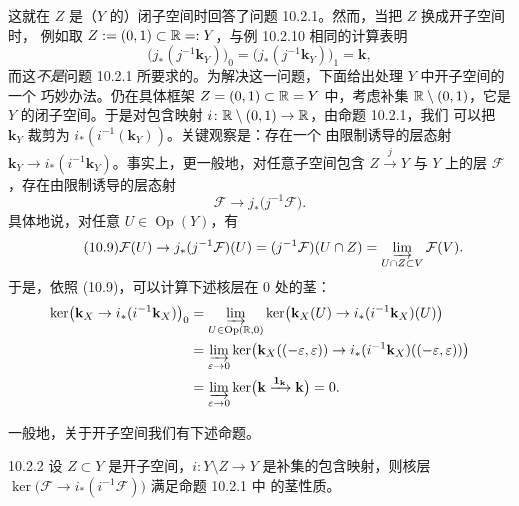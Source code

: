这就在 $Z$ 是（$Y$ 的）闭子空间时回答了问题 10.2.1。然而，当把 $Z$ 换成开子空间时，
例如取 $Z:=(0,1)\subset\mathbb{R}=:Y$，与例 10.2.10 相同的计算表明
\[
  \bigl(j_\ast(j^{-1}\mathbf{k}_Y)\bigr)_0
  =\bigl(j_\ast(j^{-1}\mathbf{k}_Y)\bigr)_1=\mathbf{k},
\]
而这\emph{不是}问题 10.2.1 所要求的。为解决这一问题，下面给出处理 $Y$ 中开子空间的一个
巧妙办法。仍在具体框架 $Z=(0,1)\subset\mathbb{R}=Y$ 中，考虑补集 $\mathbb{R}\setminus(0,1)$，它是
$Y$ 的闭子空间。于是对包含映射 $i\colon\mathbb{R}\setminus(0,1)\to\mathbb{R}$，由命题 10.2.1，我们
可以把 $\mathbf{k}_Y$ 裁剪为 $i_\ast(i^{-1}(\mathbf{k}_Y))$。关键观察是：存在一个
由限制诱导的层态射
$\mathbf{k}_Y\to i_\ast(i^{-1}\mathbf{k}_Y)$。事实上，更一般地，对任意子空间包含
$Z\xrightarrow{j}Y$ 与 $Y$ 上的层 $\mathcal{F}$，存在由限制诱导的层态射
\begin{equation}\tag{10.8}
  \mathcal{F}\to j_\ast\bigl(j^{-1}\mathcal{F}\bigr).
\end{equation}
具体地说，对任意 $U\in\operatorname{Op}(Y)$，有
\begin{equation}\tag{10.9}
  \mathcal{F}(U)\to j_\ast(j^{-1}\mathcal{F})(U)
  =(j^{-1}\mathcal{F})(U\cap Z)
  =\varinjlim_{U\cap Z\subset V}\mathcal{F}(V).
\end{equation}
于是，依照 (10.9)，可以计算下述核层在 $0$ 处的茎：
\begin{align*}
  \ker\bigl(\mathbf{k}_X\to i_\ast(i^{-1}\mathbf{k}_X)\bigr)_0
  &=\varinjlim_{U\in\operatorname{Op}(\mathbb{R},0)}
  \ker\bigl(\mathbf{k}_X(U)\to i_\ast(i^{-1}\mathbf{k}_X)(U)\bigr)\\
  &=\varinjlim_{\varepsilon\to0}
  \ker\bigl(\mathbf{k}_X((-\varepsilon,\varepsilon))
  \to i_\ast(i^{-1}\mathbf{k}_X)((-\varepsilon,\varepsilon))\bigr)\\
  &=\varinjlim_{\varepsilon\to0}\ker\bigl(\mathbf{k}
  \xrightarrow{\mathbf{1}_{\mathbf{k}}}\mathbf{k}\bigr)=0.
\end{align*}


一般地，关于开子空间我们有下述命题。

\begin{wprop}{10.2.2}
  设 $Z\subset Y$ 是开子空间，$i\colon Y\setminus Z\to Y$ 是补集的包含映射，则核层
  $\ker\bigl(\mathcal{F}\to i_\ast(i^{-1}\mathcal{F})\bigr)$ 满足命题 10.2.1 中
  的茎性质。
\end{wprop}

